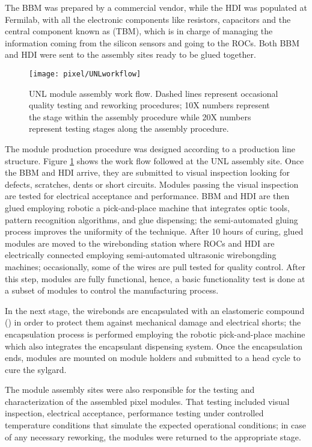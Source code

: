 The BBM was prepared by a commercial vendor, while the HDI was populated at Fermilab, with all the electronic components like resistors, capacitors and the central component known as  (TBM), which is in charge of managing the information coming from the silicon sensors and going to the ROCs. Both BBM and HDI were sent to the assembly sites ready to be glued together.  


\begin{figure}[!h]
  \centering
  \texttt{[image: pixel/UNLworkflow]}
  \caption[UNL module assembly work flow.]{UNL module assembly work flow. Dashed lines represent occasional quality testing and reworking procedures; 10X numbers represent the stage within the assembly procedure while 20X numbers represent testing stages along the assembly procedure.}\label{fig:unlworkflow}
\end{figure}


The module production procedure was designed according to a production line structure. Figure \ref{fig:unlworkflow} shows the work flow followed at the UNL assembly site. Once the BBM and HDI arrive, they are submitted to visual inspection looking for defects, scratches, dents or short circuits. Modules passing the visual inspection are tested for electrical acceptance and performance. BBM and HDI are then glued employing robotic a pick-and-place machine that integrates optic tools, pattern recognition algorithms, and glue dispensing; the semi-automated gluing process improves the uniformity of the technique. After 10 hours of curing, glued modules are moved to the wirebonding station where ROCs and HDI are electrically connected employing semi-automated ultrasonic wirebongding machines; occasionally, some of the wires are pull tested for quality control. After this step, modules are fully functional, hence, a basic functionality test is done at a subset of modules to control the manufacturing process.    

In the next stage, the wirebonds are encapsulated with an elastomeric compound () in order to protect them against mechanical damage and electrical shorts; the encapsulation process is performed employing the robotic pick-and-place machine which also integrates the encapsulant dispensing system. Once the encapsulation ends, modules are mounted on module holders and submitted to a head cycle to cure the sylgard.    

The module assembly sites were also responsible for the testing and characterization of the assembled pixel modules. That testing included visual inspection, electrical acceptance, performance testing under controlled temperature conditions that simulate the expected operational conditions; in case of any necessary reworking, the modules were returned to the appropriate stage.

